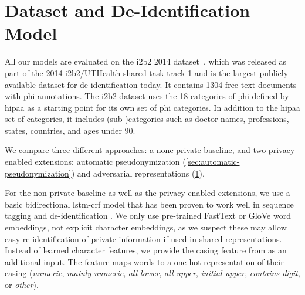 
\section{Dataset and De-Identification Model}\label{sec:deidentification-model}

All our models are evaluated on the i2b2 2014
dataset~\citep{stubbs2015annotating}, which was released as part of
the 2014 i2b2/UTHealth shared task track 1 and is the largest publicly
available dataset for de-identification today.
%
It contains 1304 free-text documents with \ac{phi} annotations.
%
The i2b2 dataset uses the 18 categories of \ac{phi} defined by \ac{hipaa} as a starting point for its own set of \ac{phi} categories.
%
In addition to the \ac{hipaa} set of categories, it includes (sub-)categories such as doctor names, professions, states, countries, and ages under 90.

%
We compare three different approaches: a none-private baseline, and two privacy-enabled extensions: automatic pseudonymization (\cref{sec:automatic-pseudonymization}) and adversarial representations (\cref{sec:deidentification-model}).

For the non-private baseline as well as the privacy-enabled extensions,
we use a basic bidirectional \ac{lstm}-\ac{crf} model that has been proven to work well in sequence tagging \citep{huang2015bidirectional,lample2016neural} and de-identification \citep{dernoncourt2017identification,liu2017identification}.
%
We only use pre-trained FastText \citep{bojanowski2016enriching} or GloVe \citep{pennington2014glove} word embeddings, not explicit character embeddings, as we suspect these may allow easy re-identification of private information if used in shared representations.
%
Instead of learned character features, we provide the casing feature from \citet{reimers2017optimal} as an additional input.
%
The feature maps words to a one-hot representation of their casing (\textit{numeric}, \textit{mainly numeric}, \textit{all lower}, \textit{all upper}, \textit{initial upper}, \textit{contains digit}, or \textit{other}).


